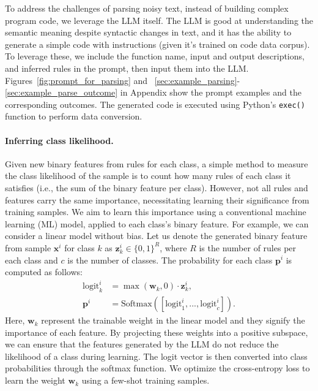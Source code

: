 \documentclass{article}
\theoremstyle{plain}
\theoremstyle{definition}
\theoremstyle{remark}
\newcommand{\cutparagraphup}{\vspace*{-0.12in}}
\begin{document}
To address the challenges of parsing noisy text, instead of building complex program code, we leverage the LLM itself. The LLM is good at understanding the semantic meaning despite syntactic changes in text, and it has the ability to generate a simple code with instructions (given it's trained on code data corpus). To leverage these, we include the function name, input and output descriptions, and inferred rules in the prompt, then input them into the LLM. Figures~\ref{fig:prompt_for_parsing} and ~\ref{sec:example_parsing}-\ref{sec:example_parse_outcome} in Appendix show the prompt examples and the corresponding outcomes. The generated code is executed using Python’s \texttt{exec()} function to perform data conversion. 



\cutparagraphup
\paragraph{Inferring class likelihood.} 
Given new binary features from rules for each class, a simple method to measure the class likelihood of the sample is to count how many rules of each class it satisfies (i.e., the sum of the binary feature per class). However, not all rules and features carry the same importance, necessitating learning their significance from training samples. 
We aim to learn this importance using a conventional machine learning (ML) model, applied to each class's binary feature. 
For example, we can consider a linear model without bias.
Let us denote the generated binary feature from sample $\mathbf{x}^i$ for class $k$ as $\mathbf{z}_k^i \in \{0, 1\}^R$, where $R$ is the number of rules per each class and $c$ is the number of classes. The probability for each class $\mathbf{p}^i$ is computed as follows: 
\begin{align}
\text{logit}_k^i &= \max(\mathbf{w}_k, 0) \cdot \mathbf{z}_k^i, \nonumber \\
\mathbf{p}^i &= \text{Softmax}({[\text{logit}_{1}^i, ..., \text{logit}_{c}^i]}). \label{eq:infer_prob}
\end{align}
Here, $\mathbf{w}_k$ represent the trainable weight in the linear model and they signify the importance of each feature. By projecting these weights into a positive subspace, we can ensure that the features generated by the LLM do not reduce the likelihood of a class during learning.
The logit vector is then converted into class probabilities through the softmax function. We optimize the cross-entropy loss to learn the weight $\mathbf{w}_k$ using a few-shot training samples. 
\end{document}
